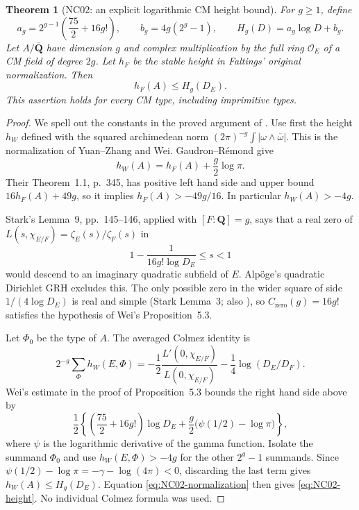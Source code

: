 \documentclass[11pt]{article}
\newtheorem{theorem}{Theorem}[section]
\theoremstyle{remark}
\begin{document}
\begin{theorem}[NC02: an explicit logarithmic CM height bound]
\label{NC02}
For $g\geq1$, define
\[
 a_g=2^{g-1}\left(\frac{75}{2}+16g!\right),
 \qquad b_g=4g(2^g-1),\qquad H_g(D)=a_g\log D+b_g.
\]
Let $A/\overline{\mathbf Q}$ have dimension $g$ and complex
multiplication by the full ring $\mathcal O_E$ of a CM field of degree
$2g$.  Let $h_F$ be the stable height in Faltings' original normalization.
Then
\begin{equation}\label{eq:NC02-height}
 h_F(A)\leq H_g(D_E).
\end{equation}
This assertion holds for every CM type, including imprimitive types.
\end{theorem}

\begin{proof}
We spell out the constants in the proved argument of
\cite[Proposition~5.3 and its proof, pp.~19--20]{NC-Wei2021}.
Use first the height $h_W$ defined with the squared archimedean norm
$(2\pi)^{-g}\int|\omega\wedge\overline\omega|$.
This is the normalization of Yuan--Zhang
\cite[\S1.1, p.~534; Theorem~1.1, p.~535]{NC-YuanZhang2018}
and Wei.  Gaudron--R\'emond
\cite[\S2.3, pp.~351--352]{NC-GRPeriods2014} give
\begin{equation}\label{eq:NC02-normalization}
 h_W(A)=h_F(A)+\frac g2\log\pi.
\end{equation}
Their Theorem~1.1, p.~345, has positive left hand side and upper bound
$16h_F(A)+49g$, so it implies $h_F(A)>-49g/16$.
In particular $h_W(A)>-4g$.

Stark's Lemma~9, pp.~145--146, applied with $[F:\mathbf Q]=g$, says
that a real zero of $L(s,\chi_{E/F})=\zeta_E(s)/\zeta_F(s)$ in
\[
 1-\frac{1}{16g!\log D_E}\leq s<1
\]
would descend to an imaginary quadratic subfield of $E$.
Alp\"oge's quadratic Dirichlet GRH excludes this.  The only possible
zero in the wider square of side $1/(4\log D_E)$ is real and simple
(Stark Lemma~3; also \cite[\S1, p.~3]{NC-Wei2021}), so
$C_{\mathrm{zero}}(g)=16g!$ satisfies the hypothesis of Wei's
Proposition~5.3.

Let $\Phi_0$ be the type of $A$.  The averaged Colmez identity is
\[
 2^{-g}\sum_\Phi h_W(E,\Phi)=
 -\frac12\frac{L'(0,\chi_{E/F})}{L(0,\chi_{E/F})}
 -\frac14\log(D_E/D_F).
\]
Wei's estimate in the proof of Proposition~5.3 bounds the right hand
side above by
\[
 \frac12\left\{
 \left(\frac{75}{2}+16g!\right)\log D_E
 +\frac g2\bigl(\psi(1/2)-\log\pi\bigr)\right\},
\]
where $\psi$ is the logarithmic derivative of the gamma function.
Isolate the summand $\Phi_0$ and use $h_W(E,\Phi)>-4g$ for the
other $2^g-1$ summands.  Since
$\psi(1/2)-\log\pi=-\gamma-\log(4\pi)<0$, discarding the last
term gives $h_W(A)\leq H_g(D_E)$.
Equation \eqref{eq:NC02-normalization} then gives
\eqref{eq:NC02-height}.  No individual Colmez formula was used.
\end{proof}
\end{document}
